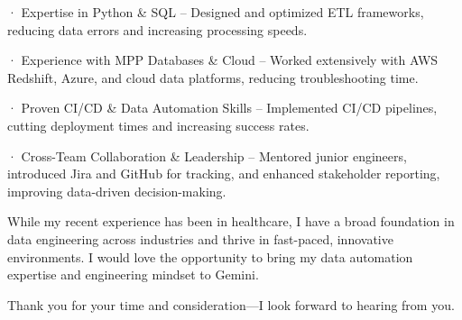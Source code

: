 \documentclass[11pt, letterpaper]{awesome-cv}
\begin{document}
\begin{cvletter}
· Expertise in Python \& SQL – Designed and optimized ETL frameworks, reducing data errors and increasing processing speeds.

· Experience with MPP Databases \& Cloud – Worked extensively with AWS Redshift, Azure, and cloud data platforms, reducing troubleshooting time.

· Proven CI/CD \& Data Automation Skills – Implemented CI/CD pipelines, cutting deployment times and increasing success rates.

· Cross-Team Collaboration \& Leadership – Mentored junior engineers, introduced Jira and GitHub for tracking, and enhanced stakeholder reporting, improving data-driven decision-making.

While my recent experience has been in healthcare, I have a broad foundation in data engineering across industries and thrive in fast-paced, innovative environments. I would love the opportunity to bring my data automation expertise and engineering mindset to Gemini.

Thank you for your time and consideration—I look forward to hearing from you.  


\end{cvletter}



\end{document}
